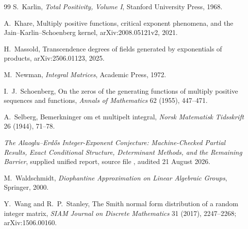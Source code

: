 \documentclass[11pt,oneside]{article}
\theoremstyle{definition}
\theoremstyle{remark}
\newcommand{\AEconj}{Alaoglu--Erd\H{o}s}
\begin{document}
\begin{thebibliography}{99}
S.~Karlin,
\newblock \emph{Total Positivity, Volume I},
\newblock Stanford University Press, 1968.

A.~Khare,
\newblock Multiply positive functions, critical exponent phenomena, and the Jain--Karlin--Schoenberg kernel,
\newblock arXiv:2008.05121v2, 2021.

H.~Massold,
\newblock Transcendence degrees of fields generated by exponentials of products,
\newblock arXiv:2506.01123, 2025.

M.~Newman,
\newblock \emph{Integral Matrices},
\newblock Academic Press, 1972.

I.~J.~Schoenberg,
\newblock On the zeros of the generating functions of multiply positive sequences and functions,
\newblock \emph{Annals of Mathematics} 62 (1955), 447--471.

A.~Selberg,
\newblock Bemerkninger om et multipelt integral,
\newblock \emph{Norsk Matematisk Tidsskrift} 26 (1944), 71--78.

\newblock \emph{The \AEconj{} Integer-Exponent Conjecture: Machine-Checked Partial Results, Exact Conditional Structure, Determinant Methods, and the Remaining Barrier},
\newblock supplied unified report, source file
, audited 21 August 2026.

M.~Waldschmidt,
\newblock \emph{Diophantine Approximation on Linear Algebraic Groups},
\newblock Springer, 2000.

Y.~Wang and R.~P.~Stanley,
\newblock The Smith normal form distribution of a random integer matrix,
\newblock \emph{SIAM Journal on Discrete Mathematics} 31 (2017), 2247--2268;
 arXiv:1506.00160.

\end{thebibliography}
\end{document}
